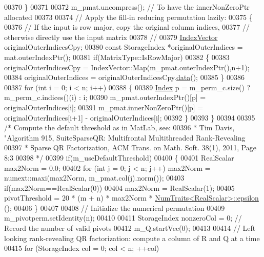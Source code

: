 \begin{DoxyCode}
00370   \}
00371 
00372   m\_pmat.uncompress(); \textcolor{comment}{// To have the innerNonZeroPtr allocated}
00373   
00374   \textcolor{comment}{// Apply the fill-in reducing permutation lazily:}
00375   \{
00376     \textcolor{comment}{// If the input is row major, copy the original column indices,}
00377     \textcolor{comment}{// otherwise directly use the input matrix}
00378     \textcolor{comment}{// }
00379     \hyperlink{group___core___module}{IndexVector} originalOuterIndicesCpy;
00380     \textcolor{keyword}{const} StorageIndex *originalOuterIndices = mat.outerIndexPtr();
00381     \textcolor{keywordflow}{if}(MatrixType::IsRowMajor)
00382     \{
00383       originalOuterIndicesCpy = IndexVector::Map(m\_pmat.outerIndexPtr(),n+1);
00384       originalOuterIndices = originalOuterIndicesCpy.\hyperlink{class_eigen_1_1_plain_object_base_ac25699535374b1854cf8494e44ad31b2}{data}();
00385     \}
00386     
00387     \textcolor{keywordflow}{for} (\textcolor{keywordtype}{int} i = 0; i < n; i++)
00388     \{
00389       \hyperlink{namespace_eigen_a62e77e0933482dafde8fe197d9a2cfde}{Index} p = m\_perm\_c.size() ? m\_perm\_c.indices()(i) : i;
00390       m\_pmat.outerIndexPtr()[p] = originalOuterIndices[i]; 
00391       m\_pmat.innerNonZeroPtr()[p] = originalOuterIndices[i+1] - originalOuterIndices[i]; 
00392     \}
00393   \}
00394   
00395   \textcolor{comment}{/* Compute the default threshold as in MatLab, see:}
00396 \textcolor{comment}{   * Tim Davis, "Algorithm 915, SuiteSparseQR: Multifrontal Multithreaded Rank-Revealing}
00397 \textcolor{comment}{   * Sparse QR Factorization, ACM Trans. on Math. Soft. 38(1), 2011, Page 8:3 }
00398 \textcolor{comment}{   */}
00399   \textcolor{keywordflow}{if}(m\_useDefaultThreshold) 
00400   \{
00401     RealScalar max2Norm = 0.0;
00402     \textcolor{keywordflow}{for} (\textcolor{keywordtype}{int} j = 0; j < n; j++) max2Norm = numext::maxi(max2Norm, m\_pmat.col(j).norm());
00403     \textcolor{keywordflow}{if}(max2Norm==RealScalar(0))
00404       max2Norm = RealScalar(1);
00405     pivotThreshold = 20 * (m + n) * max2Norm * \hyperlink{group___core___module_struct_eigen_1_1_num_traits}{NumTraits<RealScalar>::epsilon}
      ();
00406   \}
00407   
00408   \textcolor{comment}{// Initialize the numerical permutation}
00409   m\_pivotperm.setIdentity(n);
00410   
00411   StorageIndex nonzeroCol = 0; \textcolor{comment}{// Record the number of valid pivots}
00412   m\_Q.startVec(0);
00413 
00414   \textcolor{comment}{// Left looking rank-revealing QR factorization: compute a column of R and Q at a time}
00415   \textcolor{keywordflow}{for} (StorageIndex col = 0; col < n; ++col)

\end{DoxyCode}
